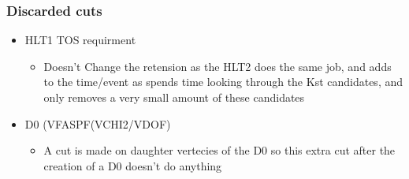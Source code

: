 \documentclass[10pt,a4paper]{beamer}
\begin{document}
\begin{frame}
\frametitle{Discarded cuts}
\begin{itemize}
\item{HLT1 TOS requirment}
\begin{itemize}
\item{Doesn't Change the retension as the HLT2 does the same job, and adds to the time/event as spends time looking through the Kst candidates, and only removes a very small amount of these candidates}
\end{itemize}
\item{D0 (VFASPF(VCHI2/VDOF)}
\begin{itemize}
\item{A cut is made on daughter vertecies of the D0 so this extra cut after the creation of a D0 doesn't do anything}
\end{itemize}
\end{itemize}
\end{frame}


\end{document}
